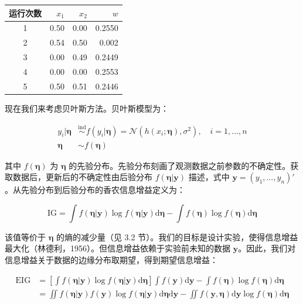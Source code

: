 \documentclass{ctexart}
\begin{document}
\begin{table}[htbp]
\begin{tabular}{c|r|r|r}
\hline
运行次数 & $x_1$ & $x_2$ & $w$ \\
\hline
1 & 0.50 & 0.00 & 0.2550 \\
2 & 0.54 & 0.50 & 0.002 \\
3 & 0.00 & 0.49 & 0.2449 \\
4 & 0.00 & 0.00 & 0.2553 \\
5 & 0.50 & 0.51 & 0.2446 \\
\hline
\end{tabular}
\end{table}

现在我们来考虑贝叶斯方法。贝叶斯模型为：

\begin{align*}
y_i|\boldsymbol{\eta}&\stackrel{\mathrm{ind}}{\sim}f(y_i|\boldsymbol{\eta})=\mathcal{N}(h(x_i;\boldsymbol{\eta}),\sigma^2),\quad i=1,\dots,n\\\boldsymbol{\eta}&\sim f(\boldsymbol{\eta})
\end{align*}

其中 $f(\boldsymbol{\eta})$ 为 $\boldsymbol{\eta}$ 的先验分布。先验分布刻画了观测数据之前参数的不确定性。获取数据后，更新后的不确定性由后验分布 $f(\boldsymbol{\eta}|\boldsymbol{y})$ 描述，式中 $\boldsymbol{y}=(y_1,\dots,y_n)'$。从先验分布到后验分布的香农信息增益定义为：

\begin{equation*}
\mathrm{IG}=\int f(\boldsymbol{\eta}|\boldsymbol{y})\log f(\boldsymbol{\eta}|\boldsymbol{y})\mathrm{d}\boldsymbol{\eta}-\int f(\boldsymbol{\eta})\log f(\boldsymbol{\eta})\mathrm{d}\boldsymbol{\eta}
\end{equation*}

该值等价于 $\boldsymbol{\eta}$ 的熵的减少量（见 3.2 节）。我们的目标是设计实验，使得信息增益最大化（林德利，1956）。但信息增益依赖于实验前未知的数据 $\boldsymbol{y}$。因此，我们对信息增益关于数据的边缘分布取期望，得到期望信息增益：

\begin{align*}
\mathrm{EIG}&=\left[\int f(\boldsymbol{\eta}|\boldsymbol{y})\log f(\boldsymbol{\eta}|\boldsymbol{y})\mathrm{d}\boldsymbol{\eta}\right]\int f(\boldsymbol{y})\mathrm{d}\boldsymbol{y}-\int f(\boldsymbol{\eta})\log f(\boldsymbol{\eta})\mathrm{d}\boldsymbol{\eta}\\
&=\iint f(\boldsymbol{\eta}|\boldsymbol{y})f(\boldsymbol{y})\log f(\boldsymbol{\eta}|\boldsymbol{y})\mathrm{d}\boldsymbol{\eta}\mathrm{d}\boldsymbol{y}-\iint f(\boldsymbol{y},\boldsymbol{\eta})\mathrm{d}\boldsymbol{y}\log f(\boldsymbol{\eta})\mathrm{d}\boldsymbol{\eta}
\end{align*}
\end{document}
